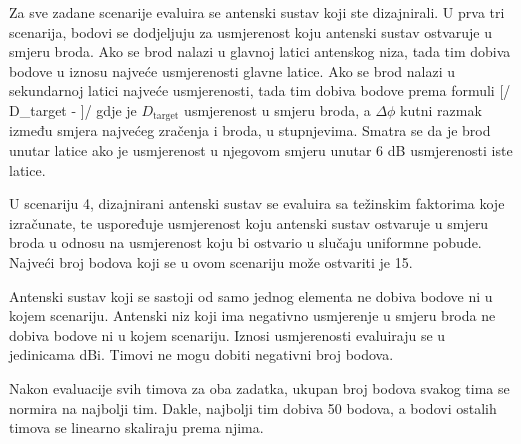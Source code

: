 Za sve zadane scenarije evaluira se antenski sustav koji ste dizajnirali. U prva tri scenarija, bodovi se dodjeljuju za usmjerenost koju antenski sustav ostvaruje u smjeru broda.
Ako se brod nalazi u glavnoj latici antenskog niza, tada tim dobiva bodove u iznosu najveće usmjerenosti glavne latice. Ako se brod nalazi u sekundarnoj latici najveće usmjerenosti, tada tim dobiva bodove prema formuli
[/ D_\textrm{target} -  ]/
gdje je $D_\textrm{target}$ usmjerenost u smjeru broda, a $\varDelta \phi$ kutni razmak između smjera najvećeg zračenja i broda, u stupnjevima. Smatra se da je brod unutar latice ako je usmjerenost u njegovom smjeru unutar 6 dB usmjerenosti iste latice.

U scenariju 4, dizajnirani antenski sustav se evaluira sa težinskim faktorima koje izračunate, te uspoređuje usmjerenost koju antenski sustav ostvaruje u smjeru broda u odnosu na usmjerenost koju bi ostvario u slučaju uniformne pobude. Najveći broj bodova koji se u ovom scenariju može ostvariti je 15.

Antenski sustav koji se sastoji od samo jednog elementa ne dobiva bodove ni u kojem scenariju. Antenski niz koji ima negativno usmjerenje u smjeru broda ne dobiva bodove ni u kojem scenariju. Iznosi usmjerenosti evaluiraju se u jedinicama dBi. Timovi ne mogu dobiti negativni broj bodova.

Nakon evaluacije svih timova za oba zadatka, ukupan broj bodova svakog tima se normira na najbolji tim. Dakle, najbolji tim dobiva 50 bodova, a bodovi ostalih timova se linearno skaliraju prema njima.
